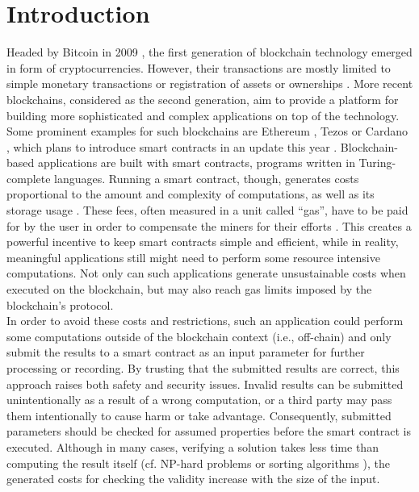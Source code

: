 \chapter{Introduction}\label{chap:introduction}
Headed by Bitcoin in 2009 \cite{bitcoin-whitepaper}, the first generation of blockchain technology emerged in form of cryptocurrencies. However, their transactions are mostly limited to simple monetary transactions or registration of assets or ownerships \cite{alharby_blockchain_2017}. More recent blockchains, considered as the second generation, aim to provide a platform for building more sophisticated and complex applications on top of the technology. Some prominent examples for such blockchains are Ethereum \cite{eth-whitepaper}, Tezos \cite{goodman_tezos_2014} or Cardano \cite{cardano_essay}, which plans to introduce smart contracts in an update this year \cite{cardano_alonzo}. Blockchain-based applications are built with smart contracts, programs written in Turing-complete languages. Running a smart contract, though, generates costs proportional to the amount and complexity of computations, as well as its storage usage \cite{alharby_blockchain_2017}. These fees, often measured in a unit called ``gas'', have to be paid for by the user in order to compensate the miners for their efforts \cite{narayanan_bitcoin}. This creates a powerful incentive to keep smart contracts simple and efficient, while in reality, meaningful applications still might need to perform some resource intensive computations. Not only can such applications generate unsustainable costs when executed on the blockchain, but may also reach gas limits imposed by the blockchain's protocol. \\
In order to avoid these costs and restrictions, such an application could perform some computations outside of the blockchain context (i.e., off-chain) and only submit the results to a smart contract as an input parameter for further processing or recording. By trusting that the submitted results are correct, this approach raises both safety and security issues. Invalid results can be submitted unintentionally as a result of a wrong computation, or a third party may pass them intentionally to cause harm or take advantage. Consequently, submitted parameters should be checked for assumed properties before the smart contract is executed. Although in many cases, verifying a solution takes less time than computing the result itself (cf. NP-hard problems \cite{nph_problems} or sorting algorithms \cite{review_sorting}\cite{cpp_issorted}), the generated costs for checking the validity increase with the size of the input. \\
